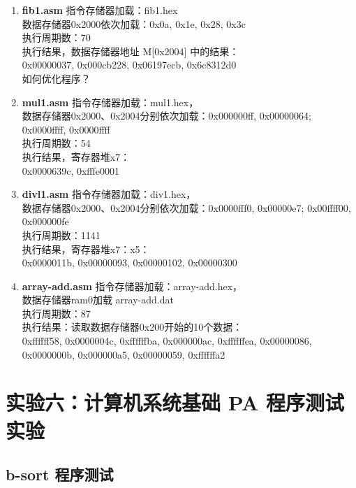 \documentclass[12pt, a4paper]{ctexart}
\begin{document}
\begin{enumerate}
    \item \textbf{fib1.asm} \quad 指令存储器加载：fib1.hex \\
    数据存储器0x2000依次加载：0x0a, 0x1e, 0x28, 0x3c \\
    执行周期数：70    \\
    执行结果，数据存储器地址 M[0x2004] 中的结果： \\
    0x00000037, 0x000cb228, 0x06197ecb, 0x6c8312d0 \\
    如何优化程序？

    \item \textbf{mul1.asm} \quad 指令存储器加载：mul1.hex， \\
    数据存储器0x2000、0x2004分别依次加载：0x000000ff, 0x00000064; 0x0000ffff, 0x0000ffff \\
    执行周期数：54  \\
    执行结果，寄存器堆x7： \\
    0x0000639c, 0xfffe0001

    \item \textbf{divl1.asm} \quad 指令存储器加载：div1.hex， \\
    数据存储器0x2000、0x2004分别依次加载：0x0000fff0, 0x00000e7; 0x00ffff00, 0x000000fe \\
    执行周期数：1141  \\
    执行结果，寄存器堆x7：x5： \\
    0x0000011b, 0x00000093, 0x00000102, 0x00000300

    \item \textbf{array-add.asm} \quad 指令存储器加载：array-add.hex， \\
    数据存储器ram0加载 array-add.dat \\
    执行周期数：87 \\
    执行结果：读取数据存储器0x200开始的10个数据： \\
    0xffffff58, 0x0000004c, 0xffffffba, 0x000000ac, 0xffffffea, 0x00000086, 0x0000000b, 0x000000a5, 0x00000059, 0xffffffa2
\end{enumerate}

\section{实验六：计算机系统基础 PA 程序测试实验}

\subsection{b-sort 程序测试}
\end{document}
